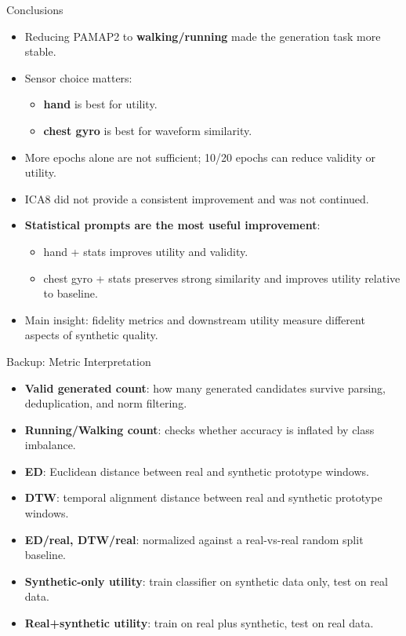 \documentclass[aspectratio=169,11pt]{ctexbeamer}
\begin{document}
\begin{frame}{Conclusions}
\begin{itemize}
  \item Reducing PAMAP2 to \textbf{walking/running} made the generation task more stable.
  \item Sensor choice matters:
  \begin{itemize}
    \item \textbf{hand} is best for utility.
    \item \textbf{chest gyro} is best for waveform similarity.
  \end{itemize}
  \item More epochs alone are not sufficient; 10/20 epochs can reduce validity or utility.
  \item ICA8 did not provide a consistent improvement and was not continued.
  \item \textbf{Statistical prompts are the most useful improvement}:
  \begin{itemize}
    \item hand + stats improves utility and validity.
    \item chest gyro + stats preserves strong similarity and improves utility relative to baseline.
  \end{itemize}
  \item Main insight: fidelity metrics and downstream utility measure different aspects of synthetic quality.
\end{itemize}
\end{frame}

\begin{frame}{Backup: Metric Interpretation}
\begin{itemize}
  \item \textbf{Valid generated count}: how many generated candidates survive parsing, deduplication, and norm filtering.
  \item \textbf{Running/Walking count}: checks whether accuracy is inflated by class imbalance.
  \item \textbf{ED}: Euclidean distance between real and synthetic prototype windows.
  \item \textbf{DTW}: temporal alignment distance between real and synthetic prototype windows.
  \item \textbf{ED/real, DTW/real}: normalized against a real-vs-real random split baseline.
  \item \textbf{Synthetic-only utility}: train classifier on synthetic data only, test on real data.
  \item \textbf{Real+synthetic utility}: train on real plus synthetic, test on real data.
\end{itemize}
\end{frame}
\end{document}
